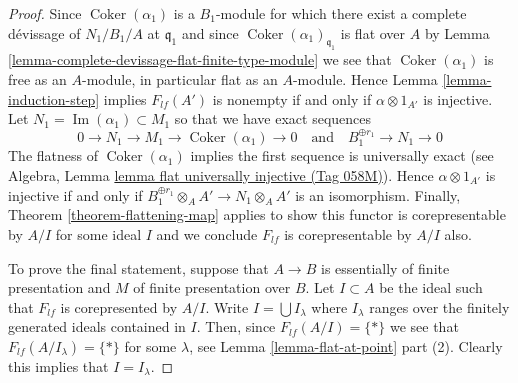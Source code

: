 \documentclass{amsart}
\theoremstyle{plain}
\theoremstyle{definition}
\theoremstyle{remark}
\numberwithin{equation}{subsection}
\def\Im{\mathop{\mathrm{Im}}}
\def\Coker{\mathop{\mathrm{Coker}}}
\begin{document}
\begin{proof}
\medskip\noindent
Since $\Coker(\alpha_1)$ is a $B_1$-module for which
there exist a complete d\'evissage of $N_1/B_1/A$ at $\mathfrak q_1$
and since $\Coker(\alpha_1)_{\mathfrak q_1}$ is
flat over $A$ by
Lemma \ref{lemma-complete-devissage-flat-finite-type-module}
we see that $\Coker(\alpha_1)$ is free as an $A$-module, in particular
flat as an $A$-module. Hence
Lemma \ref{lemma-induction-step}
implies $F_{lf}(A')$ is nonempty if and only if $\alpha \otimes 1_{A'}$
is injective. Let $N_1 = \Im(\alpha_1) \subset M_1$ so that
we have exact sequences
$$
0 \to N_1 \to M_1 \to \Coker(\alpha_1) \to 0
\quad\text{and}\quad
B_1^{\oplus r_1} \to N_1 \to 0
$$
The flatness of $\Coker(\alpha_1)$ implies the first sequence
is universally exact (see
Algebra, Lemma \href{https://stacks.math.columbia.edu/tag/058M}{lemma flat universally injective (Tag 058M)}).
Hence $\alpha \otimes 1_{A'}$ is injective if and only if
$B_1^{\oplus r_1} \otimes_A A' \to N_1 \otimes_A A'$
is an isomorphism. Finally,
Theorem \ref{theorem-flattening-map}
applies to show this functor is corepresentable by $A/I$ for some ideal $I$
and we conclude $F_{lf}$ is corepresentable by $A/I$ also.

\medskip\noindent
To prove the final statement, suppose that $A \to B$ is essentially of finite
presentation and $M$ of finite presentation over $B$. Let $I \subset A$
be the ideal such that $F_{lf}$ is corepresented by $A/I$.
Write $I = \bigcup I_\lambda$ where $I_\lambda$ ranges over the finitely
generated ideals contained in $I$. Then, since $F_{lf}(A/I) = \{*\}$
we see that $F_{lf}(A/I_\lambda) = \{*\}$ for some $\lambda$, see
Lemma \ref{lemma-flat-at-point} part (2).
Clearly this implies that $I = I_\lambda$.
\end{proof}
\end{document}
